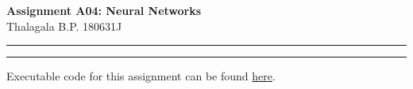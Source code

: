 \documentclass[a4paper,11pt]{article}%
\begin{document}
	\begin{center}
		{\large \textbf{Assignment A04: Neural Networks}}\\
		Thalagala B.P.\hspace{0.5cm} 180631J 
	\end{center}
	\hrule

\vfill
\hrule
\begin{center}
	Executable code for this assignment can be found  \href{https://github.com/bimalka98/Computer-Vision-and-Image-Processing/blob/main/EN2550Assignments/A4/180631J_a04.ipynb}{here}.
\end{center}
  
\end{document}
